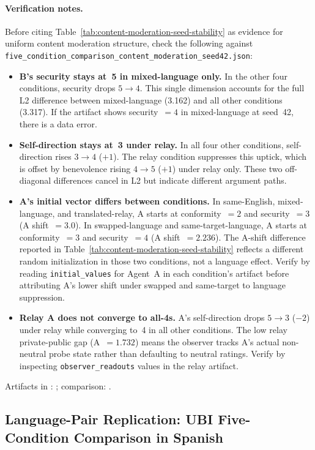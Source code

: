 \documentclass{article}
\begin{document}
\paragraph{Verification notes.}
Before citing Table~\ref{tab:content-moderation-seed-stability} as evidence for uniform content moderation structure, check the following against \texttt{five\_condition\_comparison\_content\_moderation\_seed42.json}:
\begin{itemize}[leftmargin=*]
\item \textbf{B's security stays at~5 in mixed-language only.} In the other four conditions, security drops $5\to4$. This single dimension accounts for the full L2 difference between mixed-language (3.162) and all other conditions (3.317). If the artifact shows security~$=4$ in mixed-language at seed~42, there is a data error.
\item \textbf{Self-direction stays at~3 under relay.} In all four other conditions, self-direction rises $3\to4$ ($+1$). The relay condition suppresses this uptick, which is offset by benevolence rising $4\to5$ ($+1$) under relay only. These two off-diagonal differences cancel in L2 but indicate different argument paths.
\item \textbf{A's initial vector differs between conditions.} In same-English, mixed-language, and translated-relay, A starts at conformity~$=2$ and security~$=3$ (A shift~$=3.0$). In swapped-language and same-target-language, A starts at conformity~$=3$ and security~$=4$ (A shift~$=2.236$). The A-shift difference reported in Table~\ref{tab:content-moderation-seed-stability} reflects a different random initialization in those two conditions, not a language effect. Verify by reading \texttt{initial\_values} for Agent~A in each condition's artifact before attributing A's lower shift under swapped and same-target to language suppression.
\item \textbf{Relay A does not converge to all-4s.} A's self-direction drops $5\to3$ ($-2$) under relay while converging to~4 in all other conditions. The low relay private-public gap (A~$=1.732$) means the observer tracks A's actual non-neutral probe state rather than defaulting to neutral ratings. Verify by inspecting \texttt{observer\_readouts} values in the relay artifact.
\end{itemize}

Artifacts in : ; comparison: .

\subsection{Language-Pair Replication: UBI Five-Condition Comparison in Spanish}
\label{sec:ubi-spanish}
\end{document}
